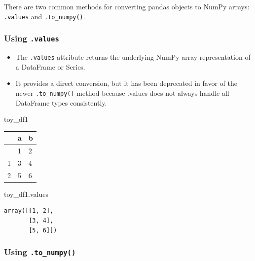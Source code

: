 \documentclass[
  letterpaper,
  DIV=11,
  numbers=noendperiod]{scrreprt}
\newenvironment{Shaded}{\begin{snugshade}}{\end{snugshade}}
\newcommand{\NormalTok}[1]{\textcolor[rgb]{0.00,0.23,0.31}{#1}}
\begin{document}
There are two common methods for converting pandas objects to NumPy
arrays: \texttt{.values} and \texttt{.to\_numpy()}.

\hypertarget{using-.values}{%
\subsubsection{\texorpdfstring{Using
\texttt{.values}}{Using .values}}\label{using-.values}}

\begin{itemize}
\item
  The \texttt{.values} attribute returns the underlying NumPy array
  representation of a DataFrame or Series.
\item
  It provides a direct conversion, but it has been deprecated in favor
  of the newer \texttt{.to\_numpy()} method because .values does not
  always handle all DataFrame types consistently.
\end{itemize}

\begin{Shaded}
\begin{Highlighting}[]
\NormalTok{toy\_df1}
\end{Highlighting}
\end{Shaded}

\begin{longtable}[]{@{}lll@{}}
\toprule\noalign{}
& a & b \\
\midrule\noalign{}
\endhead
\bottomrule\noalign{}
\endlastfoot
0 & 1 & 2 \\
1 & 3 & 4 \\
2 & 5 & 6 \\
\end{longtable}

\begin{Shaded}
\begin{Highlighting}[]
\NormalTok{toy\_df1.values}
\end{Highlighting}
\end{Shaded}

\begin{verbatim}
array([[1, 2],
       [3, 4],
       [5, 6]])
\end{verbatim}

\hypertarget{using-.to_numpy}{%
\subsubsection{\texorpdfstring{Using
\texttt{.to\_numpy()}}{Using .to\_numpy()}}\label{using-.to_numpy}}
\end{document}
